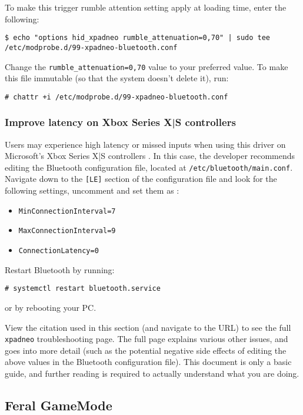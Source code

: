 \documentclass[a4paper]{article}
\begin{document}
To make this trigger rumble attention setting apply at loading time, enter the following: \cite{xpadneo-troubleshooting}

\begin{lstlisting}
$ echo "options hid_xpadneo rumble_attenuation=0,70" | sudo tee /etc/modprobe.d/99-xpadneo-bluetooth.conf
\end{lstlisting}
Change the \lstinline|rumble_attenuation=0,70| value to your preferred value.
To make this file immutable (so that the system doesn't delete it), run:
\begin{lstlisting}
# chattr +i /etc/modprobe.d/99-xpadneo-bluetooth.conf
\end{lstlisting}

\subsubsection{Improve latency on Xbox Series X|S controllers}

Users may experience high latency or missed inputs when using this driver on Microsoft's Xbox Series X|S controllers \cite{xpadneo-troubleshooting}. In this case, the developer recommends editing the Bluetooth configuration file, located at \lstinline|/etc/bluetooth/main.conf|. Navigate down to the \lstinline|[LE]| section of the configuration file and look for the following settings, uncomment and set them as \cite{xpadneo-troubleshooting}:
\begin{itemize}
    \item \lstinline|MinConnectionInterval=7|
    \item \lstinline|MaxConnectionInterval=9|
    \item \lstinline|ConnectionLatency=0|
\end{itemize}

Restart Bluetooth by running:
\begin{lstlisting}
# systemctl restart bluetooth.service
\end{lstlisting}
or by rebooting your PC.

View the citation used in this section (and navigate to the URL) to see the full \lstinline|xpadneo| troubleshooting page.
The full page explains various other issues, and goes into more detail (such as the potential negative side effects of editing the above values in the Bluetooth configuration file).
This document is only a basic guide, and further reading is required to actually understand what you are doing.

\subsection{Feral GameMode}
\end{document}
